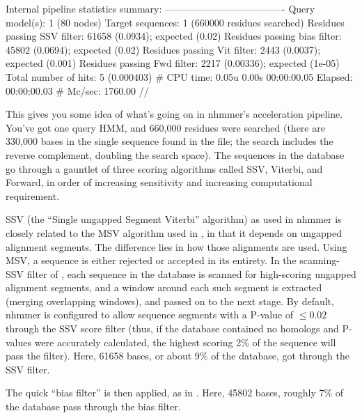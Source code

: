 \begin{samepage}
\begin{sreoutput}
Internal pipeline statistics summary:
-------------------------------------
Query model(s):                              1  (80 nodes)
Target sequences:                            1  (660000 residues searched)
Residues passing SSV filter:             61658  (0.0934); expected (0.02)
Residues passing bias filter:            45802  (0.0694); expected (0.02)
Residues passing Vit filter:              2443  (0.0037); expected (0.001)
Residues passing Fwd filter:              2217  (0.00336); expected (1e-05)
Total number of hits:                        5  (0.000403)
# CPU time: 0.05u 0.00s 00:00:00.05 Elapsed: 00:00:00.03
# Mc/sec: 1760.00
//
\end{sreoutput}
\end{samepage}

This gives you some idea of what's going on in nhmmer's acceleration
pipeline. You've got one query HMM, and 660,000 residues were 
searched (there are 330,000 bases in the single sequence found in the file;
the search includes the reverse complement, doubling the search space). The
sequences in the database go through a gauntlet of three scoring algorithms 
called SSV, Viterbi, and Forward, in order of increasing sensitivity and
increasing computational requirement.

SSV (the ``Single ungapped Segment Viterbi'' algorithm) as used 
in nhmmer is closely related to the MSV algorithm used in , 
in that it depends on ungapped alignment segments. The difference lies in
how those alignments are used. Using MSV, a sequence is either rejected or 
accepted in its entirety. In the scanning-SSV filter of , each
sequence in the database is scanned for high-scoring ungapped alignment
segments, and a window around each such segment is extracted (merging
overlapping windows), and passed on to the next stage. By default, nhmmer is
configured to allow sequence segments with a P-value of $\leq 0.02$ through the
SSV score filter (thus, if the database contained no homologs and P-values were
accurately calculated, the highest scoring 2\% of the sequence will pass the
filter). Here, 61658 bases,
or about 9\% of the database, got through the SSV filter.


The quick ``bias filter'' is then applied, as in . Here, 
   45802 bases, roughly 7\% of the database
pass through the bias filter.

